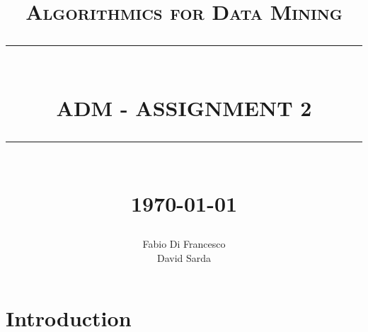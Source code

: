 \documentclass[12pt]{report}
\newcommand{\HRule}[1]{\rule{\linewidth}{#1}}
\begin{document}
\title{ \normalsize \textsc{Algorithmics for Data Mining}
		\\ [2.0cm]
		\HRule{0.5pt} \\
		\LARGE \textbf{\uppercase{ADM - Assignment 2}}
		\HRule{2pt} \\ [0.5cm]
		\normalsize \today \vspace*{5\baselineskip}}

\date{}

\author{
		Fabio Di Francesco \\ 
		David Sarda }

\maketitle
\tableofcontents
\newpage

\sectionfont{\scshape}


\section{Introduction}
\end{document}
